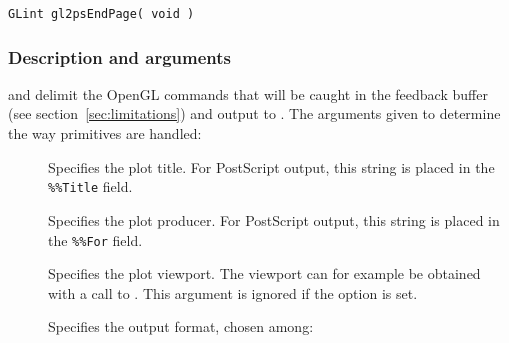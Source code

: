 \begin{verbatim}
GLint gl2psEndPage( void )
\end{verbatim}

\subsubsection{Description and arguments}

 and  delimit the OpenGL commands that
will be caught in the feedback buffer (see section~\ref{sec:limitations})
and output to . The arguments given to 
determine the way primitives are handled:

\begin{description}
\item[] Specifies the plot title. For PostScript output, this
  string is placed in the \texttt{\%\%Title} field.

\item[] Specifies the plot producer. For PostScript output,
  this string is placed in the \texttt{\%\%For} field.

\item[] Specifies the plot viewport. The viewport can for
  example be obtained with a call to . This argument is ignored if the
   option is set.

\item[] Specifies the output format, chosen among:


\end{description}
